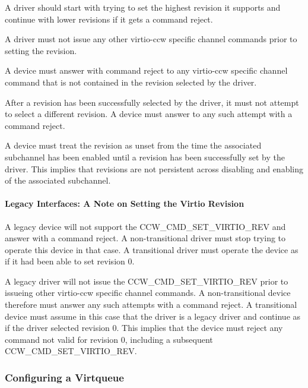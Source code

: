 A driver should start with trying to set the highest revision it
supports and continue with lower revisions if it gets a command reject.

A driver must not issue any other virtio-ccw specific channel commands
prior to setting the revision.

A device must answer with command reject to any virtio-ccw specific
channel command that is not contained in the revision selected by the
driver.

After a revision has been successfully selected by the driver, it
must not attempt to select a different revision. A device must answer
to any such attempt with a command reject.

A device must treat the revision as unset from the time the associated
subchannel has been enabled until a revision has been successfully set
by the driver. This implies that revisions are not persistent across
disabling and enabling of the associated subchannel.

\paragraph{Legacy Interfaces: A Note on Setting the Virtio Revision}\label{sec:Virtio Transport Options / Virtio over channel I/O / Device Initialization / Setting the Virtio Revision / Legacy Interfaces: A Note on Setting the Virtio Revision}

A legacy device will not support the CCW_CMD_SET_VIRTIO_REV and answer
with a command reject. A non-transitional driver must stop trying to
operate this device in that case. A transitional driver must operate
the device as if it had been able to set revision 0.

A legacy driver will not issue the CCW_CMD_SET_VIRTIO_REV prior to
issueing other virtio-ccw specific channel commands. A non-transitional
device therefore must answer any such attempts with a command reject.
A transitional device must assume in this case that the driver is a
legacy driver and continue as if the driver selected revision 0. This
implies that the device must reject any command not valid for revision
0, including a subsequent CCW_CMD_SET_VIRTIO_REV.

\subsubsection{Configuring a Virtqueue}\label{sec:Virtio Transport Options / Virtio over channel I/O / Device Initialization / Configuring a Virtqueue}

